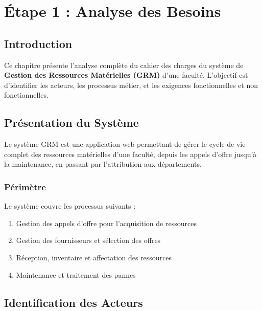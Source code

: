 \chapter{Étape 1 : Analyse des Besoins}

\section{Introduction}

Ce chapitre présente l'analyse complète du cahier des charges du système de \textbf{Gestion des Ressources Matérielles (GRM)} d'une faculté. L'objectif est d'identifier les acteurs, les processus métier, et les exigences fonctionnelles et non fonctionnelles.

\section{Présentation du Système}

Le système GRM est une application web permettant de gérer le cycle de vie complet des ressources matérielles d'une faculté, depuis les appels d'offre jusqu'à la maintenance, en passant par l'attribution aux départements.

\subsection{Périmètre}

Le système couvre les processus suivants :
\begin{enumerate}
    \item Gestion des appels d'offre pour l'acquisition de ressources
    \item Gestion des fournisseurs et sélection des offres
    \item Réception, inventaire et affectation des ressources
    \item Maintenance et traitement des pannes
\end{enumerate}

\section{Identification des Acteurs}


